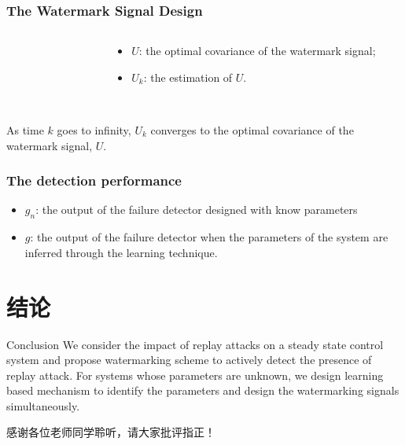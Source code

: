 \documentclass[10pt]{beamer}
\newcommand{\tikzdir}[1]{#1.tikz}
\newcommand{\inputtikz}[1]{}}
\begin{document}
\begin{frame}
  \frametitle{The Watermark Signal Design}
  \begin{columns}
    \begin{column}{0.6\textwidth}
      \begin{figure}[h!]
         \inputtikz{errU1_te}
      \end{figure}
    \end{column}
    \begin{column}{0.4\textwidth}
      \begin{itemize}
      \item $U$: the optimal covariance of the watermark signal;
      \item $U_k$: the estimation of $U$.
      \end{itemize}
    \end{column}
  \end{columns}
  ~\\
  As time $k$ goes to infinity, $U_k$ converges to the optimal covariance of the watermark signal, $U$.
\end{frame}

\begin{frame}
  \frametitle{The detection performance}
  \begin{itemize}
  \item $g_n$: the output of the failure detector designed with know parameters
  \item $g$: the output of the failure detector when the parameters of the system are inferred through the learning technique. 
  \end{itemize}
  \begin{figure}[h!]
    \centering
     \inputtikz{gng_te}
  \end{figure}
\end{frame}

\section{结论}

\begin{frame}{Conclusion}
  We consider the impact of replay attacks on a steady state control system and propose watermarking scheme to actively detect the presence of replay attack. For systems whose parameters are unknown, we design learning based mechanism to identify the parameters and design the watermarking signals simultaneously.
\end{frame}

\begin{frame}[standout]
  感谢各位老师同学聆听，请大家批评指正！
\end{frame}
\end{document}

